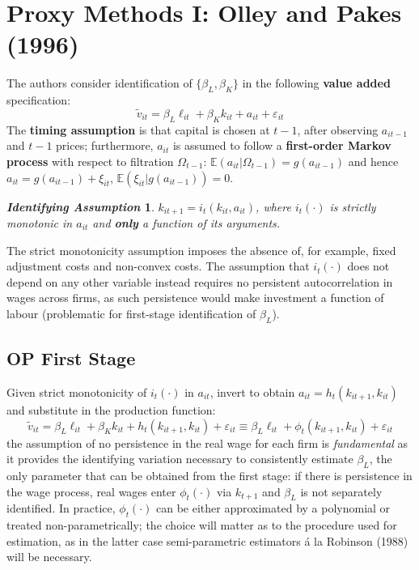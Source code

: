 \documentclass[11pt]{article}
\newtheorem*{idass}{\textit{Identifying Assumption}}
\begin{document}
\section{Proxy Methods I: Olley and Pakes (1996)}
The authors consider identification of $\{\beta_L, \beta_K\}$ in the following \textbf{value added} specification:
\begin{equation}
	\label{eq_v}
	\tilde{v}_{it} = \beta_L \ell_{it} + \beta_K k_{it} + a_{it} + \varepsilon_{it}
\end{equation}
The \textbf{timing assumption} is that capital is chosen at $t-1$, after observing $a_{it-1}$ and $t-1$ prices; furthermore, $a_{it}$ is assumed to follow a \textbf{first-order Markov process} with respect to filtration $\Omega_{t-1}$: $\mathbb{E}(a_{it}|\Omega_{t-1}) = g(a_{it-1})$  and hence $a_{it} = g(a_{it-1}) + \xi_{it}$, $\mathbb{E}(\xi_{it}|g(a_{it-1})) = 0$.

\begin{idass}
$k_{it+1} = i_t(k_{it},a_{it})$, where $i_t(\cdot)$ is strictly monotonic in $a_{it}$ and \textbf{only} a function of its arguments.
\end{idass}
The strict monotonicity assumption imposes the absence of, for example, fixed adjustment costs and non-convex costs.
The assumption that $i_t(\cdot)$ does not depend on any other variable instead requires no persistent autocorrelation in wages across firms, as such persistence would make investment a function of labour (problematic for first-stage identification of $\beta_L$).

\subsection*{OP First Stage}

Given strict monotonicity of $i_t(\cdot)$ in $a_{it}$, invert to obtain $a_{it} = h_t(k_{it+1}, k_{it})$ and substitute in the production function:
\begin{equation}
	\label{op_fs}
	\tilde{v}_{it} = \beta_L \ell_{it} + \beta_K k_{it} + h_t(k_{it+1}, k_{it}) + \varepsilon_{it} \equiv \beta_L \ell_{it} + \phi_t(k_{it+1}, k_{it}) + \varepsilon_{it}
\end{equation}
the assumption of no persistence in the real wage for each firm is \textit{fundamental} as it provides the identifying variation necessary to consistently estimate $\beta_L$, the only parameter that can be obtained from the first stage: if there is persistence in the wage process, real wages enter $\phi_t(\cdot)$ via $k_{t+1}$ and $\beta_L$ is not separately identified.
In practice, $\phi_t(\cdot)$ can be either approximated by a polynomial or treated non-parametrically; the choice will matter as to the procedure used for estimation, as in the latter case semi-parametric estimators \'{a} la Robinson (1988) will be necessary. \\
\end{document}
